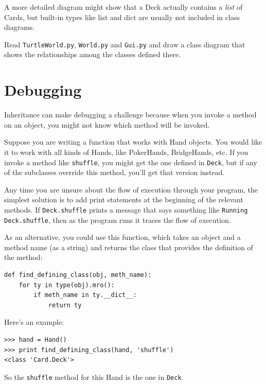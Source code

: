 \documentclass[10pt]{book}
\begin{document}
A more detailed diagram might show that a Deck actually
contains a {\em list} of Cards, but built-in types
like list and dict are usually not included in class diagrams.

\begin{exercise}

Read {\tt TurtleWorld.py}, {\tt World.py} and {\tt Gui.py}
and draw a class diagram that shows the relationships among
the classes defined there.

\end{exercise}


\section{Debugging}

Inheritance can make debugging a challenge because when you
invoke a method on an object, you might not know which method
will be invoked.

Suppose you are writing a function that works with Hand objects.
You would like it to work with all kinds of Hands, like
PokerHands, BridgeHands, etc.  If you invoke a method like
{\tt shuffle}, you might get the one defined in {\tt Deck},
but if any of the subclasses override this method, you'll
get that version instead.

Any time you are unsure about the flow of execution through your
program, the simplest solution is to add print statements at the
beginning of the relevant methods.  If {\tt Deck.shuffle} prints a
message that says something like {\tt Running Deck.shuffle}, then as
the program runs it traces the flow of execution.

As an alternative, you could use this function, which takes an
object and a method name (as a string) and returns the class that
provides the definition of the method:

\begin{verbatim}
def find_defining_class(obj, meth_name):
    for ty in type(obj).mro():
        if meth_name in ty.__dict__:
            return ty
\end{verbatim}
%
Here's an example:

\begin{verbatim}
>>> hand = Hand()
>>> print find_defining_class(hand, 'shuffle')
<class 'Card.Deck'>
\end{verbatim}
%
So the {\tt shuffle} method for this Hand is the one in {\tt Deck}.
\end{document}
